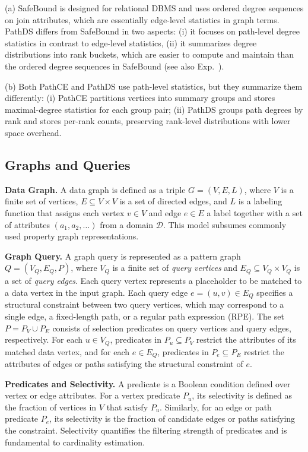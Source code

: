 \sstab (a)  %
SafeBound is designed for relational DBMS and uses ordered degree
sequences on join attributes,  which are essentially edge-level
statistics in graph terms. %
PathDS differs from SafeBound in two aspects: (i) it focuses on
path-level degree statistics in contrast to edge-level statistics,  (ii)
it summarizes degree distributions into rank buckets, which are easier
to compute and maintain than the ordered degree sequences in
SafeBound (see also Exp.~\tbf).

\sstab (b) %
Both PathCE and PathDS use path-level statistics, but they summarize
them differently: (i) PathCE partitions vertices into summary groups
and stores maximal-degree statistics for each group pair; (ii) PathDS
groups path degrees by rank and stores per-rank counts, preserving
rank-level distributions with lower space overhead.

\iffalse
\subsection{Graphs and Queries}

\noindent\textbf{Data Graph.} A data graph is defined as a triple $G = (V, E, L)$, where $V$ is a finite set
of vertices, $E \subseteq V \times V$ is a set of directed edges, and
$L$ is a labeling function that assigns each vertex $v \in V$ and edge
$e \in E$ a label together with a set of attributes
$(a_1, a_2, \ldots)$ from a domain $\mathcal{D}$.
This model subsumes commonly used property graph representations.

\noindent\textbf{Graph Query.} 
A graph query is represented as a pattern graph
$Q = (V_Q, E_Q, P)$, where $V_Q$ is a finite set of \emph{query vertices}
and $E_Q \subseteq V_Q \times V_Q$ is a set of \emph{query edges}.
Each query vertex represents a placeholder to be matched to a data
vertex in the input graph.
Each query edge $e = (u, v) \in E_Q$ specifies a structural constraint
between two query vertices, which may correspond to a single edge,
a fixed-length path, or a regular path expression (RPE).
The set $P = P_V \cup P_E$ consists of selection predicates on query
vertices and query edges, respectively.
For each $u \in V_Q$, predicates in $P_u \subseteq P_V$ restrict the
attributes of its matched data vertex, and for each $e \in E_Q$,
predicates in $P_e \subseteq P_E$ restrict the attributes of edges or
paths satisfying the structural constraint of $e$.

\noindent\textbf{Predicates and Selectivity.}
A predicate is a Boolean condition defined over vertex or edge attributes.
For a vertex predicate $P_u$, its selectivity is defined as the fraction
of vertices in $V$ that satisfy $P_u$.
Similarly, for an edge or path predicate $P_e$, its selectivity is the
fraction of candidate edges or paths satisfying the constraint.
Selectivity quantifies the filtering strength of predicates and is
fundamental to cardinality estimation.

